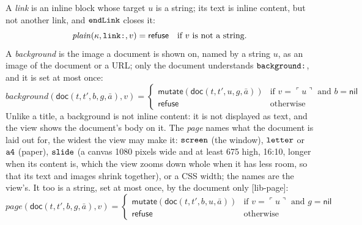 \documentclass[11pt]{article}
\numberwithin{equation}{section}
\newcommand{\kw}[1]{\ensuremath{\mathsf{#1}}}
\newcommand{\str}[1]{\ensuremath{\text{\texttt{#1}}}}
\begin{document}
A \emph{link} is an inline block whose target $u$ is a string; its text is
inline content, but not another link, and $\str{endLink}$ closes it:
\begin{equation}\label{eq:lib-link}
\mathit{plain}(\kappa, \str{link:}, v) = \kw{refuse}
  \quad\text{if } v \text{ is not a string.}
\end{equation}
A \emph{background} is the image a document is shown on, named by a string
$u$, as an image of the document or a URL; only the document understands
$\str{background:}$, and it is set at most once:
\begin{equation}\label{eq:lib-background}
\mathit{background}(\kw{doc}(t, t', b, g, \bar a), v) =
\begin{cases}
\kw{mutate}(\kw{doc}(t, t', u, g, \bar a)) & \text{if } v = \ulcorner u \urcorner
  \text{ and } b = \kw{nil} \\
\kw{refuse} & \text{otherwise}
\end{cases}
\end{equation}
Unlike a title, a background is not inline content: it is not displayed as
text, and the view shows the document's body on it.  The \emph{page} names
what the document is laid out for, the widest the view may make it:
$\str{screen}$ (the window), $\str{letter}$ or $\str{a4}$ (paper),
$\str{slide}$ (a canvas 1080 pixels wide and at least 675 high, 16:10,
longer when its content is, which the view zooms down whole when it has
less room, so that its text and images shrink together), or a CSS width;
the names are the view's.
It too is a string, set at most once, by the document only [lib-page]:
\begin{equation}\label{eq:lib-page}
\mathit{page}(\kw{doc}(t, t', b, g, \bar a), v) =
\begin{cases}
\kw{mutate}(\kw{doc}(t, t', b, u, \bar a)) & \text{if } v = \ulcorner u \urcorner
  \text{ and } g = \kw{nil} \\
\kw{refuse} & \text{otherwise}
\end{cases}
\end{equation}
\end{document}
